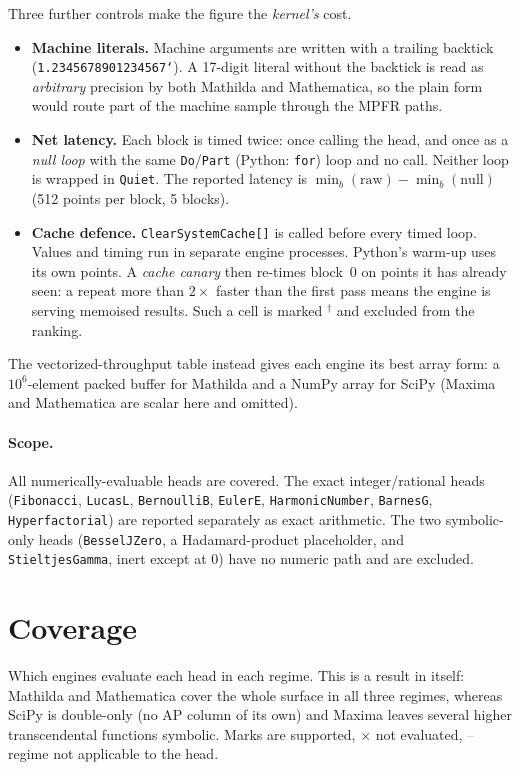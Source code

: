 \documentclass[11pt]{article}
\newcommand{\mcode}[1]{\texttt{\textcolor{mCode}{#1}}}
\newcommand{\yes}{\textcolor{green!55!black}{\checkmark}}
\newcommand{\no}{\textcolor{red!70!black}{$\times$}}
\newcommand{\na}{\textcolor{gray}{--}}
\begin{document}
Three further controls make the figure the \emph{kernel's} cost.
\begin{itemize}
\item \textbf{Machine literals.} Machine arguments are written with a trailing backtick
  (\mcode{1.2345678901234567`}). A 17-digit literal without the backtick is read as
  \emph{arbitrary} precision by both Mathilda and Mathematica, so the plain form would
  route part of the machine sample through the MPFR paths.
\item \textbf{Net latency.} Each block is timed twice: once calling the head, and once as
  a \emph{null loop} with the same \mcode{Do}/\mcode{Part} (Python: \mcode{for}) loop and
  no call. Neither loop is wrapped in \mcode{Quiet}. The reported latency is
  $\min_b(\text{raw}) - \min_b(\text{null})$ (512 points per block, 5 blocks).
\item \textbf{Cache defence.} \mcode{ClearSystemCache[]} is called before every timed
  loop. Values and timing run in separate engine processes. Python's warm-up uses its own
  points. A \emph{cache canary} then re-times block~0 on points it has already seen: a
  repeat more than $2\times$ faster than the first pass means the engine is serving
  memoised results. Such a cell is marked $^\dagger$ and excluded from the ranking.
\end{itemize} The vectorized-throughput
table instead gives each engine its best array form: a $10^6$-element packed buffer for
Mathilda and a NumPy array for SciPy (Maxima and Mathematica are scalar here and omitted).

\paragraph{Scope.}
All \sfncases{} numerically-evaluable heads are covered. The exact integer/rational heads
(\mcode{Fibonacci}, \mcode{LucasL}, \mcode{BernoulliB}, \mcode{EulerE},
\mcode{HarmonicNumber}, \mcode{BarnesG}, \mcode{Hyperfactorial}) are reported separately
as exact arithmetic. The two symbolic-only heads (\mcode{BesselJZero}, a Hadamard-product
placeholder, and \mcode{StieltjesGamma}, inert except at $0$) have no numeric path and are
excluded.

\section{Coverage}

Which engines evaluate each head in each regime. This is a result in itself: Mathilda and
Mathematica cover the whole surface in all three regimes, whereas SciPy is double-only
(no AP column of its own) and Maxima leaves several higher transcendental functions
symbolic. Marks are \yes{} supported, \no{} not evaluated, \na{} regime not applicable to
the head.
\end{document}
